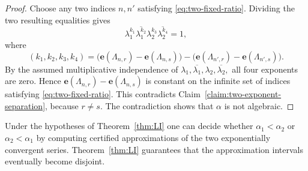 \documentclass[a4paper,UKenglish,cleveref, autoref, thm-restate]{lipics-v2021}
\begin{document}
\begin{proof}
Choose any two indices \(n,n'\) satisfying
\eqref{eq:two-fixed-ratio}. Dividing the two resulting equalities gives
\[
  \lambda_1^{k_1}
  \overline{\lambda_1^{k_2}}
  \lambda_2^{k_3}
  \overline{\lambda_2^{k_4}}
  =1,
\]
where
\[
  (k_1,k_2,k_3,k_4)
  =
  \bigl(
    \mathbf e(\Lambda_{n,r})-\mathbf e(\Lambda_{n,s})
  \bigr)
  -
  \bigl(
    \mathbf e(\Lambda_{n',r})-\mathbf e(\Lambda_{n',s})
  \bigr).
\]
By the assumed multiplicative independence of
\(
  \lambda_1,\overline{\lambda_1},
  \lambda_2,\overline{\lambda_2},
\)
all four exponents are zero. Hence
\(
  \mathbf e(\Lambda_{n,r})-\mathbf e(\Lambda_{n,s})
\)
is constant on the infinite set of indices satisfying
\eqref{eq:two-fixed-ratio}. This contradicts
Claim~\ref{claim:two-exponent-separation}, because \(r\ne s\).
The contradiction shows that \(\alpha\) is not algebraic.
\end{proof}

\begin{corollary}
Under the hypotheses of Theorem~\ref{thm:LI} one can decide whether
$\alpha_1<\alpha_2$ or $\alpha_2<\alpha_1$
by computing certified
approximations of the two exponentially convergent series. Theorem~\ref{thm:LI} 
guarantees that the approximation intervals eventually become
disjoint.
\end{corollary}

%

\end{document}
